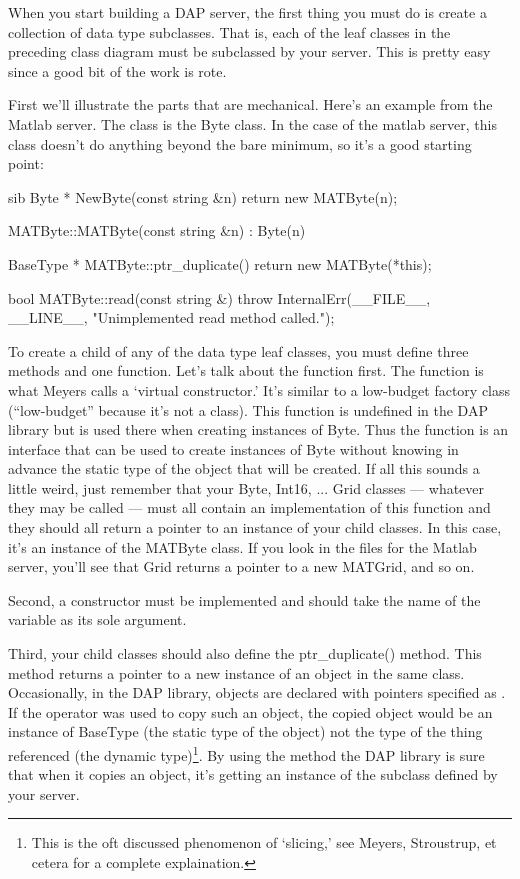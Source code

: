\documentclass{dods-paper}
\begin{document}
When you start building a DAP server, the first thing you must do is
create a collection of data type subclasses. That is, each of the leaf
classes in the preceding class diagram must be subclassed by your
server. This is pretty easy since a good bit of the work is rote.

First we'll illustrate the parts that are mechanical. Here's an
example from the Matlab server. The class is the Byte class. In the
case of the matlab server, this class doesn't do anything beyond the
bare minimum, so it's a good starting point:

\begin{vcode}{sib}
Byte *
NewByte(const string &n)
{
    return new MATByte(n);
}

MATByte::MATByte(const string &n) : Byte(n)
{
}

BaseType *
MATByte::ptr_duplicate()
{
    return new MATByte(*this);
}

bool
MATByte::read(const string &)
{
    throw InternalErr(__FILE__, __LINE__, "Unimplemented read method
    called.");
}
\end{vcode}

To create a child of any of the data type leaf classes, you must
define three methods and one function. Let's talk about the function
first. The function  is what Meyers calls a `virtual
constructor.'  It's similar to a low-budget factory class
(``low-budget'' because it's not a class). This function is undefined
in the DAP library but is used there when creating instances of Byte.
Thus the function  is an interface that can be used to
create instances of Byte without knowing in advance the static type of
the object that will be created. If all this sounds a little weird,
just remember that your Byte, Int16, ... Grid classes --- whatever
they may be called --- must all contain an implementation of this
function and they should all return a pointer to an instance of your
child classes. In this case, it's an instance of the MATByte class. If
you look in the files for the Matlab server, you'll see that Grid
returns a pointer to a new MATGrid, and so on.

Second, a constructor must be implemented and should take the name of the
variable as its sole argument.

Third, your child classes should also define the ptr\_duplicate() method.
This method returns a pointer to a new instance of an object in the same
class.  Occasionally, in the DAP library, objects are declared with pointers
specified as .  If the  operator was used to copy
such an object, the copied object would be an instance of BaseType (the
static type of the object) not the type of the thing referenced (the dynamic
type)\footnote{This is the oft discussed phenomenon of `slicing,' see Meyers,
  Stroustrup, et cetera for a complete explaination.}. By using the
 method the DAP library is sure that when it copies an
object, it's getting an instance of the subclass defined by your server.
\end{document}
